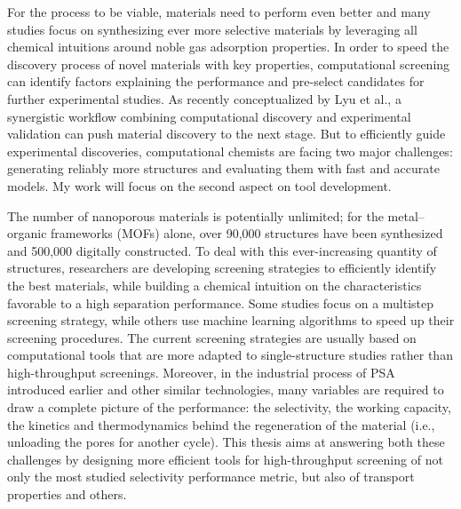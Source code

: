 For the process to be viable, materials need to perform even better and many studies focus on synthesizing ever more selective materials by leveraging all chemical intuitions around noble gas adsorption properties.\autocite{Chen_2014, Li_2019, Pei_2022} In order to speed the discovery process of novel materials with key properties, computational screening can identify factors explaining the performance and pre-select candidates for further experimental studies. As recently conceptualized by Lyu et al., a synergistic workflow combining computational discovery and experimental validation can push material discovery to the next stage.\autocite{Lyu_2020, Jablonka_2022} But to efficiently guide experimental discoveries, computational chemists are facing two major challenges: generating reliably more structures and evaluating them with fast and accurate models. My work will focus on the second aspect on tool development.

The number of nanoporous materials is potentially unlimited; for the metal--organic frameworks (MOFs) alone, over 90,000 structures have been synthesized\autocite{Groom_2016} and 500,000 digitally constructed\autocite{Wilmer_2012,Boyd_2016,Colon_2017}. To deal with this ever-increasing quantity of structures, researchers are developing screening strategies to efficiently identify the best materials, while building a chemical intuition on the characteristics favorable to a high separation performance. Some studies focus on a multistep screening strategy,\autocite{Wilmer_2012,Qiao_2016,Yang_2020} while others use machine learning algorithms to speed up their screening procedures.\autocite{Simon_2015} The current screening strategies are usually based on computational tools that are more adapted to single-structure studies rather than high-throughput screenings. Moreover, in the industrial process of PSA introduced earlier and other similar technologies, many variables are required to draw a complete picture of the performance: the selectivity, the working capacity, the kinetics and thermodynamics behind the regeneration of the material (i.e., unloading the pores for another cycle).\autocite{Kumar_1994} This thesis aims at answering both these challenges by designing more efficient tools for high-throughput screening of not only the most studied selectivity performance metric, but also of transport properties and others. 


\begin{center}
\end{center}

